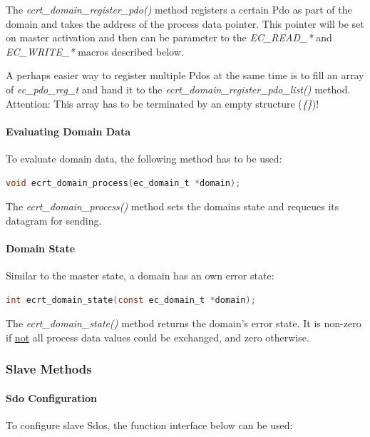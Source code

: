\documentclass[a4paper,12pt,BCOR6mm,bibtotoc,idxtotoc]{scrbook}
\begin{document}
The \textit{ecrt\_domain\_register\_pdo()} method registers a certain
Pdo as part of the domain and takes the address of the process data
pointer. This pointer will be set on master activation and then can be
parameter to the \textit{EC\_READ\_*} and \textit{EC\_WRITE\_*} macros
described below.

A perhaps easier way to register multiple Pdos at the same time is to
fill an array of \textit{ec\_pdo\_reg\_t} and hand it to the
\textit{ecrt\_domain\_register\_pdo\_list()} method. Attention: This
array has to be terminated by an empty structure (\textit{\{\}})!

\paragraph{Evaluating Domain Data}

To evaluate domain data, the following method has to be used:

\begin{lstlisting}[language=C]
  void ecrt_domain_process(ec_domain_t *domain);
\end{lstlisting}

The \textit{ecrt\_domain\_process()} method sets the domains state and
requeues its datagram for sending.

\paragraph{Domain State}

Similar to the master state, a domain has an own error state:

\begin{lstlisting}[language=C]
  int ecrt_domain_state(const ec_domain_t *domain);
\end{lstlisting}

The \textit{ecrt\_domain\_state()} method returns the domain's error
state. It is non-zero if \underline{not} all process data values could
be exchanged, and zero otherwise.

\subsubsection{Slave Methods}
\label{sec:ecrt-slave}

\paragraph{Sdo Configuration}

To configure slave Sdos, the function interface below can be used:
\end{document}
